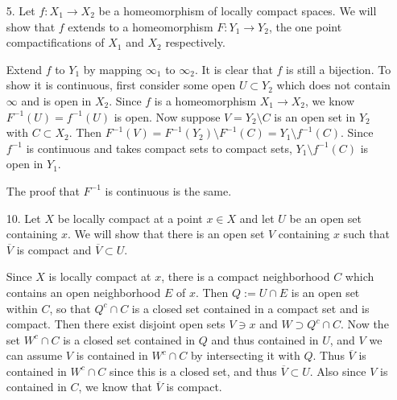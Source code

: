 \documentclass[11pt, reqno]{article}
\theoremstyle{plain}
\theoremstyle{definition}
\theoremstyle{remark}
\begin{document}
\begin{enumerate}
    \item[5.] Let $f: X_1 \rightarrow X_2$ be a homeomorphism of locally compact spaces. We will show that $f$ extends 
    to a homeomorphism $F: Y_1 \rightarrow Y_2$, the one point compactifications of $X_1$ and $X_2$ respectively. 

    Extend $f$ to $Y_1$ by mapping $\infty_1$ to $\infty_2$. It is clear that $f$ is still a bijection. To show it is continuous, 
    first consider some open $U \subset Y_2$ which does not contain $\infty$ and is open in $X_2$. 
    Since $f$ is a homeomorphism $X_1 \rightarrow X_2$, we know $F^{-1}(U) = f^{-1}(U)$ is open. 
    Now suppose $V = Y_2 \setminus C$ is an open set in $Y_2$ with $C \subset X_2$. Then $F^{-1}(V) = F^{-1}(Y_2)\setminus F^{-1}(C) = 
    Y_1 \setminus f^{-1}(C)$. Since $f^{-1}$ is continuous and takes compact sets to compact sets, $Y_1 \setminus f^{-1}(C)$
    is open in $Y_1$. 

    The proof that $F^{-1}$ is continuous is the same.

    \item[10.] Let $X$ be locally compact at a point $x \in X$ and let $U$ be an open set containing $x$. We will show that 
    there is an open set $V$ containing $x$ such that $\overline{V}$ is compact and $\overline{V}\subset U$. 

    Since $X$ is locally compact at $x$, there is a compact neighborhood $C$ which contains an open neighborhood $E$ of $x$.
    Then $Q := U \cap E$ is an open set within $C$, so that $Q^c \cap C$ is a closed set contained in a compact set 
    and is compact. Then there exist disjoint open sets $V \ni x$ and $W \supset Q^c \cap C$. Now the set $W^c \cap C$ is 
    a closed set contained in $Q$ and thus contained in $U$, and $V$ we can assume $V$ is contained in $W^c \cap C$ by 
    intersecting it with $Q$. Thus $\overline{V}$ is contained in $W^c \cap C$ since this is a closed set, and thus 
    $\overline{V} \subset U$. Also since $V$ is contained in $C$, we know that $\overline{V}$ is compact. 
\end{enumerate}
\end{document}
